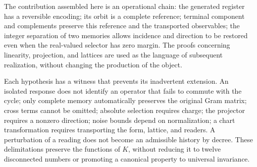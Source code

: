 The contribution assembled here is an operational chain: the generated register has a reversible encoding; its orbit is a complete reference; terminal component and complements preserve this reference and the transported observables; the integer separation of two memories allows incidence and direction to be restored even when the real-valued selector has zero margin. The proofs concerning linearity, projection, and lattices are used as the language of subsequent realization, without changing the production of the object.

Each hypothesis has a witness that prevents its inadvertent extension. An isolated response does not identify an operator that fails to commute with the cycle; only complete memory automatically preserves the original Gram matrix; cross terms cannot be omitted; absolute selection requires charge; the projector requires a nonzero direction; noise bounds depend on normalization; a chart transformation requires transporting the form, lattice, and readers. A perturbation of a reading does not become an admissible history by decree. These delimitations preserve the functions of \(K\), without reducing it to twelve disconnected numbers or promoting a canonical property to universal invariance.
